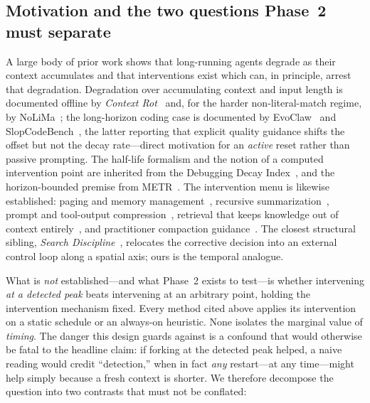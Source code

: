 \subsection{Motivation and the two questions Phase~2 must separate}
\label{sec:intervention:motivation}

A large body of prior work shows that long-running agents degrade as their
context accumulates and that interventions exist which can, in principle,
arrest that degradation. Degradation over accumulating context and input
length is documented offline by \emph{Context Rot}~\cite{hong2025contextrot}
and, for the harder non-literal-match regime, by NoLiMa~\cite{modarressi2025nolima};
the long-horizon coding case is documented by EvoClaw~\cite{deng2026evoclaw}
and SlopCodeBench~\cite{orlanski2026slopcodebench}, the latter reporting that
explicit quality guidance shifts the offset but not the decay rate---direct
motivation for an \emph{active} reset rather than passive prompting. The
half-life formalism and the notion of a computed intervention point are
inherited from the Debugging Decay Index~\cite{adnan2025ddi}, and the
horizon-bounded premise from METR~\cite{kwa2025metr}. The intervention menu is
likewise established: paging and memory management~\cite{packer2023memgpt},
recursive summarization~\cite{wang2023recursive}, prompt and tool-output
compression~\cite{jiang2023llmlingua,jiang2024longllmlingua,chopra2026headroom},
retrieval that keeps knowledge out of context entirely~\cite{lewis2020rag},
and practitioner compaction guidance~\cite{rajasekaran2025contextengineering,yan2025dontbuild}.
The closest structural sibling, \emph{Search Discipline}~\cite{srinivasan2026searchdiscipline},
relocates the corrective decision into an external control loop along a spatial
axis; ours is the temporal analogue.

What is \emph{not} established---and what Phase~2 exists to test---is whether
intervening \emph{at a detected peak} beats intervening at an arbitrary point,
holding the intervention mechanism fixed. Every method cited above applies its
intervention on a static schedule or an always-on heuristic. None isolates the
marginal value of \emph{timing}. The danger this design guards against is a
confound that would otherwise be fatal to the headline claim: if forking at the
detected peak helped, a naive reading would credit ``detection,'' when in fact
\emph{any} restart---at any time---might help simply because a fresh context is
shorter. We therefore decompose the question into two contrasts that must not
be conflated:

